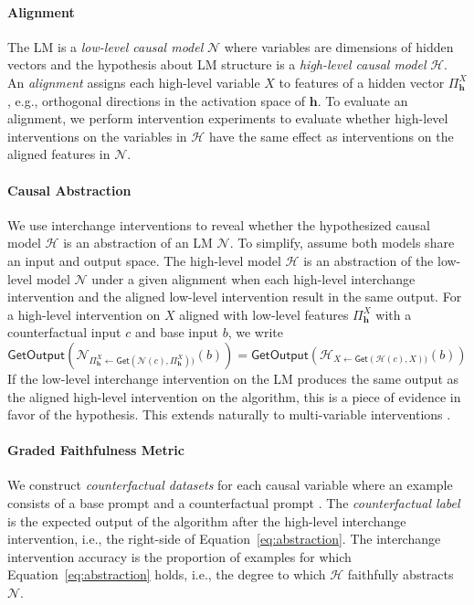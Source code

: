 \documentclass{article}
\theoremstyle{plain}
\theoremstyle{definition}
\theoremstyle{remark}
\begin{document}
\paragraph{Alignment} The LM is a \textit{low-level causal model} $\mathcal{N}$ where variables are dimensions of hidden vectors and the hypothesis about LM structure is a \textit{high-level causal model} $\mathcal{H}$. An \textit{alignment} assigns each high-level variable $X$ to features of a hidden vector $\Pi^{X}_{\mathbf{h}}$, e.g., orthogonal directions in the activation space of $\mathbf{h}$.
To evaluate an alignment, we perform intervention experiments to evaluate whether high-level interventions on the variables in $\mathcal{H}$ have the same effect as interventions on the aligned features in $\mathcal{N}$.

\paragraph{Causal Abstraction} We use interchange interventions to reveal whether the hypothesized causal model $\mathcal{H}$ is an abstraction of an LM $\mathcal{N}$. To simplify, assume both models share an input and output space. The high-level model $\mathcal{H}$ is an abstraction of the low-level model $\mathcal{N}$ under a given alignment when each high-level interchange intervention and the aligned low-level intervention result in the same output. For a high-level intervention on $X$ aligned with low-level features $\Pi^{X}_{\mathbf{h}}$ with a counterfactual input $c$ and base input $b$, we write
\begin{equation}\label{eq:abstraction}
\mathsf{GetOutput}(\mathcal{N}_{\Pi_{\mathbf{h}}^{X} \leftarrow \mathsf{Get}(\mathcal{N}(c), \Pi^X_\mathbf{h}))}(b)) = \mathsf{GetOutput}(\mathcal{H}_{X \leftarrow \mathsf{Get}(\mathcal{H}(c), X))}(b))
\end{equation}
If the low-level interchange intervention on the LM produces the same output as the aligned high-level intervention on the algorithm, this is a piece of evidence in favor of the hypothesis. This extends naturally to multi-variable interventions \citep{geiger2024causalabstractiontheoreticalfoundation}.

\paragraph{Graded Faithfulness Metric} We construct \textit{counterfactual datasets} for each causal variable where an example consists of a base prompt and a counterfactual prompt . The \textit{counterfactual label} is the expected output of the algorithm after the high-level interchange intervention, i.e., the right-side of Equation~\ref{eq:abstraction}.  The interchange intervention accuracy is the proportion of examples for which Equation~\ref{eq:abstraction} holds, i.e., the degree to which $\mathcal{H}$ faithfully abstracts $\mathcal{N}$.
\end{document}
